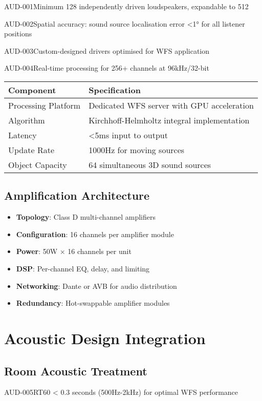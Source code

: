 \begin{requirement}{AUD-001}{Minimum 128 independently driven loudspeakers, expandable to 512}
\begin{requirement}{AUD-002}{Spatial accuracy: sound source localisation error <1° for all listener positions}
\begin{requirement}{AUD-003}{Custom-designed drivers optimised for WFS application}
\begin{requirement}{AUD-004}{Real-time processing for 256+ channels at 96kHz/32-bit}
\begin{table}[H]
\centering
\begin{tabularx}{\textwidth}{@{}lX@{}}
\toprule
\textbf{Component} & \textbf{Specification} \\
\midrule
Processing Platform & Dedicated WFS server with GPU acceleration \\
Algorithm & Kirchhoff-Helmholtz integral implementation \\
Latency & <5ms input to output \\
Update Rate & 1000Hz for moving sources \\
Object Capacity & 64 simultaneous 3D sound sources \\
\bottomrule
\end{tabularx}
\end{table}

\subsection{Amplification Architecture}

\begin{itemize}
    \item \textbf{Topology}: Class D multi-channel amplifiers
    \item \textbf{Configuration}: 16 channels per amplifier module
    \item \textbf{Power}: 50W × 16 channels per unit
    \item \textbf{DSP}: Per-channel EQ, delay, and limiting
    \item \textbf{Networking}: Dante or AVB for audio distribution
    \item \textbf{Redundancy}: Hot-swappable amplifier modules
\end{itemize}

\section{Acoustic Design Integration}

\subsection{Room Acoustic Treatment}

\begin{requirement}{AUD-005}{RT60 < 0.3 seconds (500Hz-2kHz) for optimal WFS performance}

\begin{figure}[H]
\centering
{}
\end{figure}
\end{requirement}
\end{requirement}
\end{requirement}
\end{requirement}
\end{requirement}
